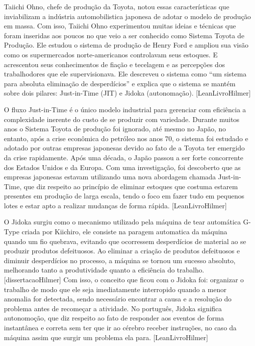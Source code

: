 Taiichi Ohno, chefe de produção da Toyota, notou essas características que inviabilizam a indústria automobilistica japonesa de adotar o modelo de produção em massa. Com isso, Taiichi Ohno experimentou muitas ideias e técnicas que foram inseridas aos poucos no que veio a ser conhecido como Sistema Toyota de Produção. Ele estudou o sistema de produção de Henry Ford e ampliou sua visão como os supermercados norte-americanos controlavam seus estoques. E acrescentou seus conhecimentos de fiação e tecelagem e as percepções dos trabalhodores que ele supervisionava. Ele descreveu o sistema como “um sistema para absoluta eliminação de desperdícios” e explica que o sistema se mantém sobre dois pilares: Just-in-Time (JIT) e Jidoka (autonomação). [LeanLivroHilmer]

O fluxo Just-in-Time é o único modelo industrial para gerenciar com eficiência a complexidade inerente do custo de se produzir com variedade. Durante muitos anos o Sistema Toyota de produção foi ignorado, até mesmo no Japão, no entanto, após a crise econômica do petróleo nos anos 70, o sistema foi estudado e adotado por outras empresas japonesas devido ao fato de a Toyota ter emergido da crise rapidamente. Após uma década, o Japão passou a ser forte concorrente dos Estados Unidos e da Europa. Com uma investigação, foi descoberto que as empresas japonesas estavam utilizando uma nova abordagem chamada Just-in-Time, que diz respeito ao princípio de eliminar estoques que costuma estarem presentes em produção de larga escala, tendo o foco em fazer tudo em pequenos lotes e estar apto a realizar mudanças de forma rápida. [LeanLivroHilmer]

O Jidoka surgiu como o mecanismo utilizado pela máquina de tear automática G-Type criada por Kiichiro, ele consiste na paragem automatica da máquina quando um fio quebrava, evitando que ocorressem desperdícios de material ao se produzir produtos defeituosos. Ao eliminar a criação de produtos defeituosos e diminuir desperdícios no processo, a máquina se tornou um sucesso absoluto, melhorando tanto a produtividade quanto a eficiência do trabalho. [dissertacaoHilmer] Com isso, o conceito que ficou com o Jidoka foi: organizar o trabalho de modo que ele seja imediatamente interropido quando a menor anomalia for detectada, sendo necessário encontrar a causa e a resolução do problema antes de recomeçar a atividade. No português, Jidoka significa autonomoção, que diz respeito ao fato de responder aos eventos de forma instantânea e correta sem ter que ir ao cérebro receber instruções, no caso da máquina assim que surgir um problema ela para. [LeanLivroHilmer]

